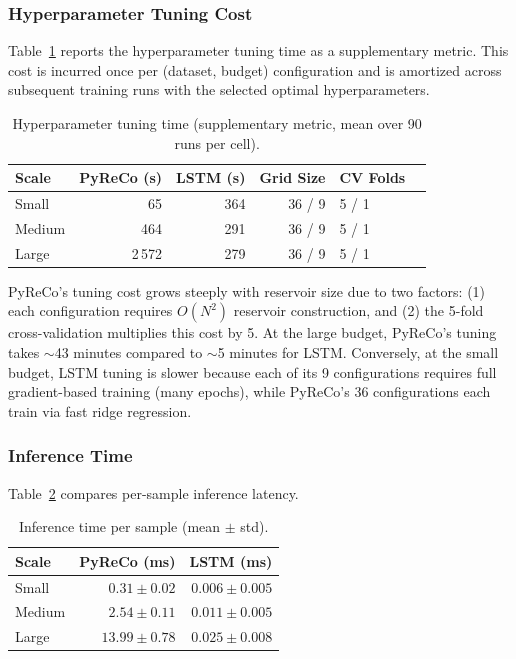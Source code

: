 \subsubsection{Hyperparameter Tuning Cost}

Table~\ref{tab:tuning_time} reports the hyperparameter tuning time as a supplementary metric. This cost is incurred once per (dataset, budget) configuration and is amortized across subsequent training runs with the selected optimal hyperparameters.

\begin{table}[H]
\centering
\caption{Hyperparameter tuning time (supplementary metric, mean over 90 runs per cell).}
\label{tab:tuning_time}
\begin{tabular}{@{}lrrrll@{}}
\toprule
Scale & PyReCo (s) & LSTM (s) & Grid Size & CV Folds \\
\midrule
Small  & 65   & 364  & 36 / 9  & 5 / 1 \\
Medium & 464  & 291  & 36 / 9  & 5 / 1 \\
Large  & 2\,572 & 279  & 36 / 9  & 5 / 1 \\
\bottomrule
\end{tabular}
\end{table}

PyReCo's tuning cost grows steeply with reservoir size due to two factors: (1) each configuration requires $O(N^2)$ reservoir construction, and (2) the 5-fold cross-validation multiplies this cost by 5. At the large budget, PyReCo's tuning takes ${\sim}$43 minutes compared to ${\sim}$5 minutes for LSTM. Conversely, at the small budget, LSTM tuning is slower because each of its 9 configurations requires full gradient-based training (many epochs), while PyReCo's 36 configurations each train via fast ridge regression.

\subsubsection{Inference Time}

Table~\ref{tab:inference_time} compares per-sample inference latency.

\begin{table}[H]
\centering
\caption{Inference time per sample (mean $\pm$ std).}
\label{tab:inference_time}
\begin{tabular}{@{}lrr@{}}
\toprule
Scale & PyReCo (ms) & LSTM (ms) \\
\midrule
Small  & $0.31 \pm 0.02$ & $0.006 \pm 0.005$ \\
Medium & $2.54 \pm 0.11$ & $0.011 \pm 0.005$ \\
Large  & $13.99 \pm 0.78$ & $0.025 \pm 0.008$ \\
\bottomrule
\end{tabular}
\end{table}

